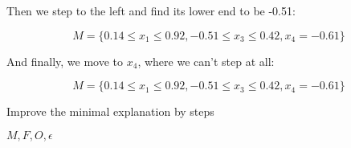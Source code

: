 \documentclass[12pt]{article}
\begin{document}
Then we step to the left and find its lower end to be -0.51:

\[
M = \{0.14 \le x_1 \le 0.92,
      -0.51 \le x_3 \le 0.42,
      x_4 = -0.61\}
\]

And finally, we move to $x_4$, where we can't step at all:

\[
M = \{0.14 \le x_1 \le 0.92,
      -0.51 \le x_3 \le 0.42,
      x_4 = -0.61\}
\]




\begin{algorithm}
	\caption{Improve the minimal explanation by steps}
	\begin{algorithmic}
		 {$M, F, O, \epsilon$}
				\EndWhile
				\\
				\EndWhile
			\EndFor
			\\
		\EndProcedure
	\end{algorithmic}
\end{algorithm}


\end{document}
